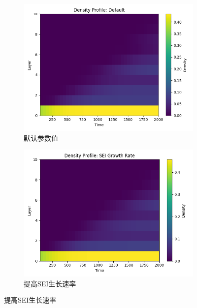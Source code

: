 \documentclass{article}
\begin{document}
  \begin{figure}[H]
      \centering
      \begin{subfigure}[b]{0.19\textwidth}
          \centering
          \includegraphics[scale=0.2]{figs/parallel_density_profile_default.png}
          \caption{默认参数值}
         
      \end{subfigure}
      \hfill
      \begin{subfigure}[b]{0.19\textwidth}
          \centering
          \includegraphics[scale=0.2]{figs/parallel_density_profile_sei_growth_rate.png}
          \caption{提高SEI生长速率}
        

\end{subfigure}
\end{figure}
\end{document}

